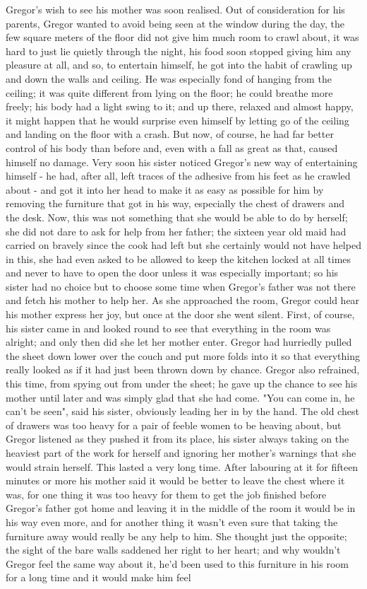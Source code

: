 \documentclass[12pt]{book}
\begin{document}
    Gregor's wish to see his mother was soon realised. Out of consideration for his parents, Gregor wanted to avoid being seen at the window during the day, the few square meters of the floor did not give him much room to crawl about, it was hard to just lie quietly through the night, his food soon stopped giving him any pleasure at all, and so, to entertain himself, he got into the habit of crawling up and down the walls and ceiling. He was especially fond of hanging from the ceiling; it was quite different from lying on the floor; he could breathe more freely; his body had a light swing to it; and up there, relaxed and almost happy, it might happen that he would surprise even himself by letting go of the ceiling and landing on the floor with a crash. But now, of course, he had far better control of his body than before and, even with a fall as great as that, caused himself no damage. Very soon his sister noticed Gregor's new way of entertaining himself - he had, after all, left traces of the adhesive from his feet as he crawled about - and got it into her head to make it as easy as possible for him by removing the furniture that got in his way, especially the chest of drawers and the desk. Now, this was not something that she would be able to do by herself; she did not dare to ask for help from her father; the sixteen year old maid had carried on bravely since the cook had left but she certainly would not have helped in this, she had even asked to be allowed to keep the kitchen locked at all times and never to have to open the door unless it was especially important; so his sister had no choice but to choose some time when Gregor's father was not there and fetch his mother to help her. As she approached the room, Gregor could hear his mother express her joy, but once at the door she went silent. First, of course, his sister came in and looked round to see that everything in the room was alright; and only then did she let her mother enter. Gregor had hurriedly pulled the sheet down lower over the couch and put more folds into it so that everything really looked as if it had just been thrown down by chance. Gregor also refrained, this time, from spying out from under the sheet; he gave up the chance to see his mother until later and was simply glad that she had come. "You can come in, he can't be seen", said his sister, obviously leading her in by the hand. The old chest of drawers was too heavy for a pair of feeble women to be heaving about, but Gregor listened as they pushed it from its place, his sister always taking on the heaviest part of the work for herself and ignoring her mother's warnings that she would strain herself. This lasted a very long time. After labouring at it for fifteen minutes or more his mother said it would be better to leave the chest where it was, for one thing it was too heavy for them to get the job finished before Gregor's father got home and leaving it in the middle of the room it would be in his way even more, and for another thing it wasn't even sure that taking the furniture away would really be any help to him. She thought just the opposite; the sight of the bare walls saddened her right to her heart; and why wouldn't Gregor feel the same way about it, he'd been used to this furniture in his room for a long time and it would make him feel 
\end{document}
